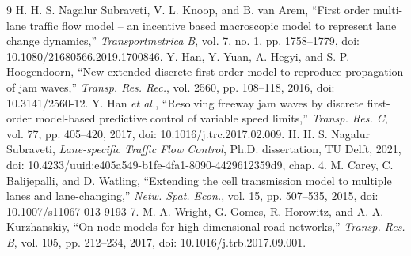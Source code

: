\documentclass[10pt,a4paper]{article}
\begin{document}
\begin{thebibliography}{9}\setlength{\itemsep}{0pt}
 H. H. S. Nagalur Subraveti, V. L. Knoop, and B. van Arem,
``First order multi-lane traffic flow model -- an incentive based macroscopic
model to represent lane change dynamics,'' \emph{Transportmetrica B},
vol. 7, no. 1, pp. 1758--1779, doi: 10.1080/21680566.2019.1700846.
 Y. Han, Y. Yuan, A. Hegyi, and S. P. Hoogendoorn,
``New extended discrete first-order model to reproduce propagation of jam
waves,'' \emph{Transp. Res. Rec.}, vol. 2560, pp. 108--118, 2016,
doi: 10.3141/2560-12.
 Y. Han \emph{et al.}, ``Resolving freeway jam waves by
discrete first-order model-based predictive control of variable speed limits,''
\emph{Transp. Res. C}, vol. 77, pp. 405--420, 2017,
doi: 10.1016/j.trc.2017.02.009.
 H. H. S. Nagalur Subraveti, \emph{Lane-specific Traffic
Flow Control}, Ph.D. dissertation, TU Delft, 2021,
doi: 10.4233/uuid:e405a549-b1fe-4fa1-8090-4429612359d9, chap. 4.
 M. Carey, C. Balijepalli, and D. Watling, ``Extending the cell
transmission model to multiple lanes and lane-changing,'' \emph{Netw. Spat.
Econ.}, vol. 15, pp. 507--535, 2015, doi: 10.1007/s11067-013-9193-7.
 M. A. Wright, G. Gomes, R. Horowitz, and A. A. Kurzhanskiy,
``On node models for high-dimensional road networks,'' \emph{Transp. Res. B},
vol. 105, pp. 212--234, 2017, doi: 10.1016/j.trb.2017.09.001.
\end{thebibliography}
\end{document}
